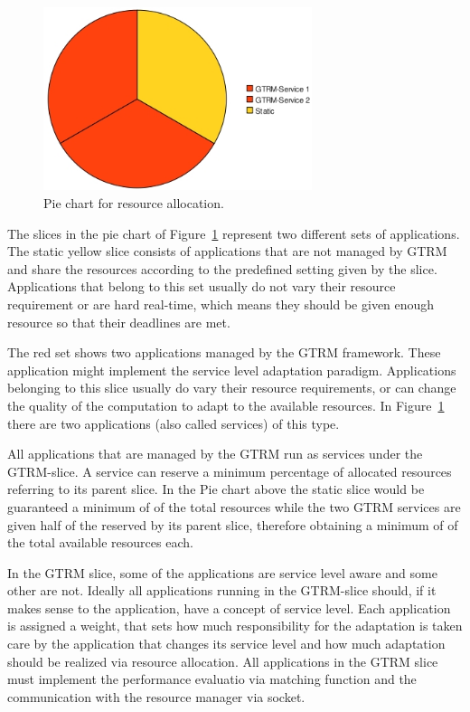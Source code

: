 \documentclass[nobiblatex]{LTHthesis}
\begin{document}
\begin{figure}[t]
  \centering
  \includegraphics[width=0.7\textwidth]{piechart.jpeg}
  \caption{Pie chart for resource allocation.}
  \label{fig:Piechart}
\end{figure}

The slices in the pie chart of Figure~\ref{fig:Piechart} represent two
different sets of applications. The static yellow slice consists of
applications that are not managed by GTRM and share the resources
according to the predefined setting given by the slice. Applications
that belong to this set usually do not vary their resource requirement
or are hard real-time, which means they should be given enough resource
so that their deadlines are met. 

The red set shows two applications managed by the GTRM framework. These
application might implement the service level adaptation paradigm.
Applications belonging to this slice usually do vary their resource
requirements, or can change the quality of the computation to adapt to the
available resources. In Figure~\ref{fig:Piechart} there are two applications
(also called services) of this type.

All applications that are managed by the GTRM run as services under the 
GTRM-slice. A service can reserve a minimum percentage of allocated 
resources referring to its parent slice.
In the Pie chart above the static slice would be guaranteed a minimum of 
 of the total resources while the two GTRM services are given 
half of the  reserved by its parent slice, therefore obtaining
a minimum of  of the total available resources each.

In the GTRM slice, some of the applications are service level aware and some
other are not. Ideally all applications running in the GTRM-slice should, 
if it makes sense to the application, have a concept of service level.
Each application is assigned a weight, that sets how much responsibility
for the adaptation is taken care by the application that changes its service
level and how much adaptation should be realized via resource allocation.
All applications in the GTRM slice must implement the performance evaluatio
via matching function and the communication with the resource manager via
socket.
\end{document}
